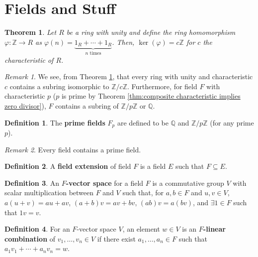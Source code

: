 \documentclass[parskip=half]{scrartcl}  %
\theoremstyle{definition}
\newtheorem{definition}{Definition}[section]
\theoremstyle{plain}
\newtheorem{theorem}{Theorem}[definition]
\theoremstyle{remark}
\newtheorem{remark}{Remark}[definition]
\begin{document}
\section{Fields and Stuff}

\begin{theorem}
    \label{thm:characteristic ring homomorphism}
    Let $R$ be a ring with unity and define the ring homomorphism $\varphi:\mathbb{Z}\to R$ as
    $\varphi(n)=\underbrace{1_R+\cdots+1_R}_{n\text{ times}}$.
    Then, $\ker(\varphi)=c\mathbb{Z}$ for $c$ the characteristic of $R$.
\end{theorem}

\begin{remark}
    We see, from Theorem \ref{thm:characteristic ring homomorphism}, that every ring with unity and
    characteristic $c$ contains a subring isomorphic to $\mathbb{Z}/c\mathbb{Z}$.
    Furthermore, for field $F$ with characteristic $p$ ($p$ is prime by Theorem
    \ref{thm:composite characteristic implies zero divisor}), $F$ contains a subring of
    $\mathbb{Z}/p\mathbb{Z}$ or $\mathbb{Q}$.
\end{remark}

\begin{definition}
    The \textbf{prime fields} $F_p$ are defined to be $\mathbb{Q}$ and $\mathbb{Z}/p\mathbb{Z}$
    (for any prime $p$).
\end{definition}

\begin{remark}
    Every field contains a prime field.
\end{remark}

\begin{definition}
    A \textbf{field extension} of field $F$ is a field $E$ such that $F\subseteq E$.
\end{definition}

\begin{definition}
    An \textbf{$F$-vector space} for a field $F$ is a commutative group $V$ with scalar
    multiplication between $F$ and $V$ such that, for $a,b\in F$ and $u,v\in V$, $a(u+v)=au+av$,
    $(a+b)v=av+bv$, $(ab)v=a(bv)$, and $\exists 1\in F$ such that $1v=v$.
\end{definition}

\begin{definition}
    For an $F$-vector space $V$, an element $w\in V$ is an \textbf{$F$-linear combination} of
    $v_1,\dots,v_n\in V$ if there exist $a_1,\dots,a_n\in F$ such that
    $a_1v_1+\cdots+a_nv_n=w$.
\end{definition}
\end{document}

